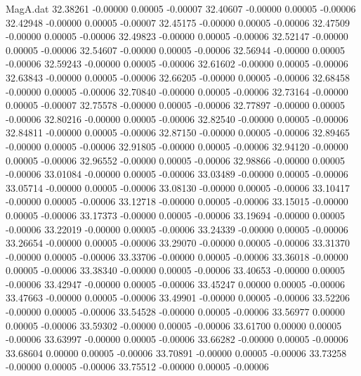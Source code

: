 \begin{filecontents}{MagA.dat}
  32.38261   -0.00000    0.00005   -0.00007
  32.40607   -0.00000    0.00005   -0.00006
  32.42948   -0.00000    0.00005   -0.00007
  32.45175   -0.00000    0.00005   -0.00006
  32.47509   -0.00000    0.00005   -0.00006
  32.49823   -0.00000    0.00005   -0.00006
  32.52147   -0.00000    0.00005   -0.00006
  32.54607   -0.00000    0.00005   -0.00006
  32.56944   -0.00000    0.00005   -0.00006
  32.59243   -0.00000    0.00005   -0.00006
  32.61602   -0.00000    0.00005   -0.00006
  32.63843   -0.00000    0.00005   -0.00006
  32.66205   -0.00000    0.00005   -0.00006
  32.68458   -0.00000    0.00005   -0.00006
  32.70840   -0.00000    0.00005   -0.00006
  32.73164   -0.00000    0.00005   -0.00007
  32.75578   -0.00000    0.00005   -0.00006
  32.77897   -0.00000    0.00005   -0.00006
  32.80216   -0.00000    0.00005   -0.00006
  32.82540   -0.00000    0.00005   -0.00006
  32.84811   -0.00000    0.00005   -0.00006
  32.87150   -0.00000    0.00005   -0.00006
  32.89465   -0.00000    0.00005   -0.00006
  32.91805   -0.00000    0.00005   -0.00006
  32.94120   -0.00000    0.00005   -0.00006
  32.96552   -0.00000    0.00005   -0.00006
  32.98866   -0.00000    0.00005   -0.00006
  33.01084   -0.00000    0.00005   -0.00006
  33.03489   -0.00000    0.00005   -0.00006
  33.05714   -0.00000    0.00005   -0.00006
  33.08130   -0.00000    0.00005   -0.00006
  33.10417   -0.00000    0.00005   -0.00006
  33.12718   -0.00000    0.00005   -0.00006
  33.15015   -0.00000    0.00005   -0.00006
  33.17373   -0.00000    0.00005   -0.00006
  33.19694   -0.00000    0.00005   -0.00006
  33.22019   -0.00000    0.00005   -0.00006
  33.24339   -0.00000    0.00005   -0.00006
  33.26654   -0.00000    0.00005   -0.00006
  33.29070   -0.00000    0.00005   -0.00006
  33.31370   -0.00000    0.00005   -0.00006
  33.33706   -0.00000    0.00005   -0.00006
  33.36018   -0.00000    0.00005   -0.00006
  33.38340   -0.00000    0.00005   -0.00006
  33.40653   -0.00000    0.00005   -0.00006
  33.42947   -0.00000    0.00005   -0.00006
  33.45247    0.00000    0.00005   -0.00006
  33.47663   -0.00000    0.00005   -0.00006
  33.49901   -0.00000    0.00005   -0.00006
  33.52206   -0.00000    0.00005   -0.00006
  33.54528   -0.00000    0.00005   -0.00006
  33.56977    0.00000    0.00005   -0.00006
  33.59302   -0.00000    0.00005   -0.00006
  33.61700    0.00000    0.00005   -0.00006
  33.63997   -0.00000    0.00005   -0.00006
  33.66282   -0.00000    0.00005   -0.00006
  33.68604    0.00000    0.00005   -0.00006
  33.70891   -0.00000    0.00005   -0.00006
  33.73258   -0.00000    0.00005   -0.00006
  33.75512   -0.00000    0.00005   -0.00006

\end{filecontents}
